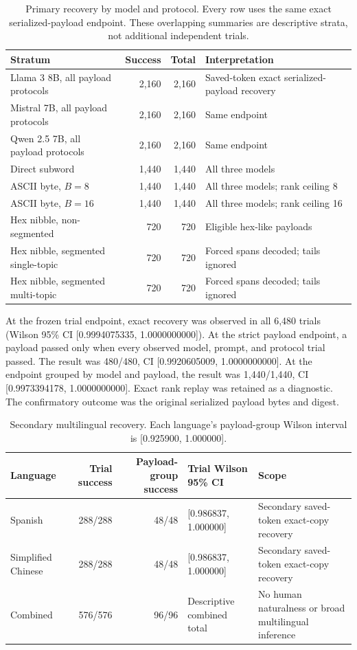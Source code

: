 \documentclass[fleqn,10pt]{wlscirep}
\begin{document}
\begin{table}[H]
\centering
\small
\begin{tabularx}{\textwidth}{L{0.28\textwidth}r r Y}
\toprule
Stratum & Success & Total & Interpretation \\
\midrule
Llama 3 8B, all payload protocols & 2,160 & 2,160 & Saved-token exact serialized-payload recovery \\
Mistral 7B, all payload protocols & 2,160 & 2,160 & Same endpoint \\
Qwen 2.5 7B, all payload protocols & 2,160 & 2,160 & Same endpoint \\
Direct subword & 1,440 & 1,440 & All three models \\
ASCII byte, \(B=8\) & 1,440 & 1,440 & All three models; rank ceiling 8 \\
ASCII byte, \(B=16\) & 1,440 & 1,440 & All three models; rank ceiling 16 \\
Hex nibble, non-segmented & 720 & 720 & Eligible hex-like payloads \\
Hex nibble, segmented single-topic & 720 & 720 & Forced spans decoded; tails ignored \\
Hex nibble, segmented multi-topic & 720 & 720 & Forced spans decoded; tails ignored \\
\bottomrule
\end{tabularx}
\caption{\label{tab:primary-strata}Primary recovery by model and protocol. Every row uses the same exact serialized-payload endpoint. These overlapping summaries are descriptive strata, not additional independent trials.}
\end{table}

At the frozen trial endpoint, exact recovery was observed in all 6,480 trials (Wilson 95\% CI [0.9994075335, 1.0000000000]). At the strict payload endpoint, a payload passed only when every observed model, prompt, and protocol trial passed. The result was 480/480, CI [0.9920605009, 1.0000000000]. At the endpoint grouped by model and payload, the result was 1,440/1,440, CI [0.9973394178, 1.0000000000]. Exact rank replay was retained as a diagnostic. The confirmatory outcome was the original serialized payload bytes and digest.

\begin{table}[H]
\centering
\small
\begin{tabularx}{\textwidth}{L{0.22\textwidth}r r L{0.24\textwidth}Y}
\toprule
Language & Trial success & Payload-group success & Trial Wilson 95\% CI & Scope \\
\midrule
Spanish & 288/288 & 48/48 & [0.986837, 1.000000] & Secondary saved-token exact-copy recovery \\
Simplified Chinese & 288/288 & 48/48 & [0.986837, 1.000000] & Secondary saved-token exact-copy recovery \\
Combined & 576/576 & 96/96 & Descriptive combined total & No human naturalness or broad multilingual inference \\
\bottomrule
\end{tabularx}
\caption{\label{tab:multilingual}Secondary multilingual recovery. Each language's payload-group Wilson interval is [0.925900, 1.000000].}
\end{table}
\end{document}
